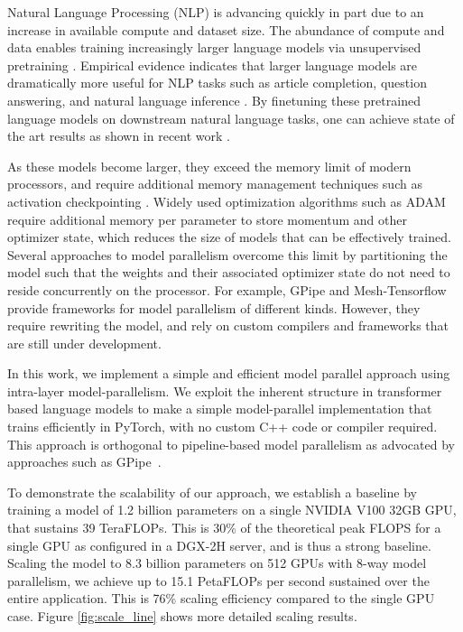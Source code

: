 \documentclass{article}
\begin{document}
Natural Language Processing (NLP) is advancing quickly in part due to an increase in available compute and dataset size. The abundance of compute and data enables training increasingly larger language models via unsupervised pretraining \citep{devlin2018bert,Radford2019GPT2}. Empirical evidence indicates that larger language models are dramatically more useful for NLP tasks such as article completion, question answering, and natural language inference \cite{ALBERT2019,T5}. By finetuning these pretrained language models on downstream natural language tasks, one can achieve state of the art results as shown in recent work \cite{devlin2018bert, ELMo, Howard2018ULMFIT, Radford2018GPT, Radford2017Sentiment, Le2016seq2seqtransfer, roberta,transformerxl,xlnet,mtdnn,ALBERT2019}. 
    
As these models become larger, they exceed the memory limit of modern processors, and require additional memory management techniques such as activation checkpointing \citep{activation_checkpointing}. Widely used optimization algorithms such as ADAM require additional memory per parameter to store momentum and other optimizer state, which reduces the size of models that can be effectively trained. Several approaches to model parallelism overcome this limit by partitioning the model such that the weights and their associated optimizer state do not need to reside concurrently on the processor. For example, GPipe \cite{GPipe} and Mesh-Tensorflow \cite{mesh_tf} provide frameworks for model parallelism of different kinds. However, they require rewriting the model, and rely on custom compilers and frameworks that are still under development.
    
In this work,  we implement a simple and efficient model parallel approach using intra-layer model-parallelism. We exploit the inherent structure in transformer based language models to make a simple model-parallel implementation that trains efficiently in PyTorch, with no custom C++ code or compiler required. This approach is orthogonal to pipeline-based model parallelism as advocated by approaches such as GPipe~\cite{GPipe}. 
    
To demonstrate the scalability of our approach, we establish a baseline by training a model of 1.2 billion parameters on a single NVIDIA V100 32GB GPU, that sustains 39 TeraFLOPs. This is 30\% of the theoretical peak FLOPS for a single GPU as configured in a DGX-2H server, and is thus a strong baseline. Scaling the model to 8.3 billion parameters on 512 GPUs with 8-way model parallelism, we achieve up to 15.1 PetaFLOPs per second sustained over the entire application. This is 76\% scaling efficiency compared to the single GPU case. Figure \ref{fig:scale_line} shows more detailed scaling results.
    
\end{document}
